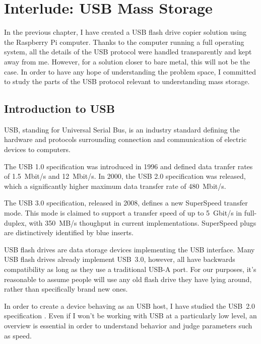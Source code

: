 \chapter{Interlude: USB Mass Storage}
    In the previous chapter, I have created a USB flash drive copier solution using the Raspberry Pi computer.  Thanks to the computer running a full operating system, all the details of the USB protocol were handled transparently and kept away from me.  However, for a solution closer to bare metal, this will not be the case.  In order to have any hope of understanding the problem space, I committed to study the parts of the USB protocol relevant to understanding mass storage.
    
    \section{Introduction to USB}
    
    USB, standing for Universal Serial Bus, is an industry standard defining the hardware and protocols surrounding connection and communication of electric devices to computers.  
    
    The USB 1.0 specification was introduced in 1996 and defined data tranfer rates of 1.5~Mbit/s and 12~Mbit/s\cite{hui1394}.   In 2000, the USB 2.0 specification was released, which a significantly higher maximum data transfer rate of 480~Mbit/s.
    
    The USB 3.0 specification, released in 2008, defines a new SuperSpeed transfer mode.  This mode is claimed to support a transfer speed of up to 5~Gbit/s in full-duplex, with 350~MB/s thoughput in current implementations\cite{usb-3-hp}.  SuperSpeed plugs are distinctively identified by blue inserts. 
    
    USB flash drives are data storage devices implementing the USB interface.  Many USB flash drives already implement USB~3.0\cite{wirecutter-best-usb-3-0}, however, all have backwards compatibility as long as they use a traditional USB‑A port.  For our purposes, it's reasonable to assume people will use any old flash drive they have lying around, rather than specifically brand new ones.
    
    In order to create a device behaving as an USB host, I have studied the USB~2.0 specification .  Even if I won't be working with USB at a particularly low level, an overview is essential in order to understand behavior and judge parameters such as speed.
    

